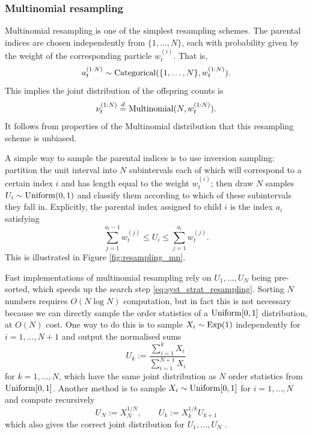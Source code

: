 \subsubsection{Multinomial resampling}
Multinomial resampling \parencite{gordon1993,efron1994} is one of the simplest resampling schemes.
The parental indices are chosen independently from $\{1, \dots, N\}$, each with probability given by the weight of the corresponding particle $w_t^{(i)}$. 
That is, 
\begin{equation*}
a_t^{(1:N)} \sim \operatorname{Categorical}( \{1,\dots, N\}, w_t^{(1:N)} ) .
\end{equation*}
This implies the joint distribution of the offspring counts is 
\begin{equation*}
\nu_t^{(1:N)} \overset{d}{=} \operatorname{Multinomial}(N, w_t^{(1:N)} ) .
\end{equation*}
It follows from properties of the Multinomial distribution that this resampling scheme is unbiased.

A simple way to sample the parental indices is to use inversion sampling: partition the unit interval into $N$ subintervals each of which will correspond to a certain index $i$ and has length equal to the weight $w_t^{(i)}$; then draw $N$ samples $U_i \sim \operatorname{Uniform}(0,1)$ and classify them according to which of these subintervals they fall in.
Explicitly, the parental index assigned to child $i$ is the index $a_i$ satisfying
\begin{equation}\label{eq:syst_strat_resampling}
\sum_{j=1}^{a_i -1} w_t^{(j)} \leq U_i \leq \sum_{j=1}^{a_i} w_t^{(j)} .
\end{equation}
This is illustrated in Figure \ref{fig:resampling_mn}. 

Fast implementations of multinomial resampling rely on $U_1,\dots,U_N$ being pre-sorted, which speeds up the search step \eqref{eq:syst_strat_resampling}. Sorting $N$ numbers requires $O(N\log N)$ computation, but in fact this is not necessary because we can directly sample the order statistics of a $\operatorname{Uniform}[0,1]$ distribution, at $O(N)$ cost.
One way to do this \parencite[Proposition 9.1]{chopin2020} is to sample $X_i \sim \operatorname{Exp}(1)$ independently for $i=1,\dots,N+1$ and output the normalised sums
\begin{equation}
U_k := \frac{\sum_{i=1}^k X_i}{\sum_{i=1}^{N+1} X_i}
\end{equation}
for $k=1,\dots,N$, which have the same joint distribution as $N$ order statistics from $\operatorname{Uniform}[0,1]$.
Another method is to sample $X_i \sim \operatorname{Uniform}[0,1]$ for $i=1,\dots,N$ and compute recursively
\begin{equation}
U_N := X_N^{1/N} , \qquad U_k := X_k^{1/k} U_{k+1}
\end{equation}
which also gives the correct joint distribution for $U_1,\dots,U_N$ \parencite{hol2006}.


